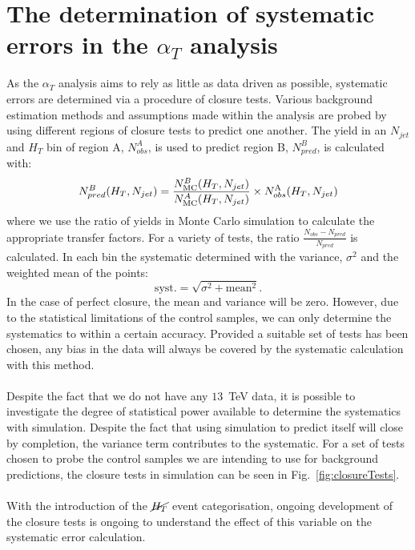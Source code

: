 
\section{The determination of systematic errors in the $\alpha_T$ analysis}
\label{sec:closureTests}

As the $\alpha_T$ analysis aims to rely as little as data driven as possible, systematic errors are determined via a procedure of closure tests. Various background estimation methods and assumptions made within the analysis are probed by using different regions of closure tests to predict one another. The yield in an $N_{jet}$ and $H_T$ bin of region A, $N_{obs}^A$, is used to predict region B, $N_{pred}^B$, is calculated with:
\begin{equation}
  N_{pred}^B(H_T,N_{jet}) = \frac{N_{\rm MC}^
      B(H_T,N_{jet})}{N_{\rm MC}^A(H_T,N_{jet})} \times 
      N_{obs}^{\rm A}(H_T,N_{jet})   
\end{equation}
where we use the ratio of yields in Monte Carlo simulation to calculate the appropriate transfer factors. For a variety of tests, the ratio $\frac{N_{obs}-N_{pred}}{N_{pred}}$ is calculated. In each bin the systematic determined with the variance, $\sigma^2$ and the weighted mean of the points: 
\begin{equation}
\textrm{syst.} = \sqrt{\sigma^2+\textrm{mean}^2}.
\end{equation}
In the case of perfect closure, the mean and variance will be zero. However, due to the statistical limitations of the control samples, we can only determine the systematics to within a certain accuracy. Provided a suitable set of tests has been chosen, any bias in the data will always be covered by the systematic calculation with this method.
\\\\
Despite the fact that we do not have any $13$~TeV data, it is possible to investigate the degree of statistical power available to determine the systematics with simulation. Despite the fact that using simulation to predict itself will close by completion, the variance term contributes to the systematic. For a set of tests chosen to probe the control samples we are intending to use for background predictions, the closure tests in simulation can be seen in Fig.~\ref{fig:closureTests}.
\\\\
With the introduction of the $\cancel{H_T}$ event categorisation, ongoing development of the closure tests is ongoing to understand the effect of this variable on the systematic error calculation.

